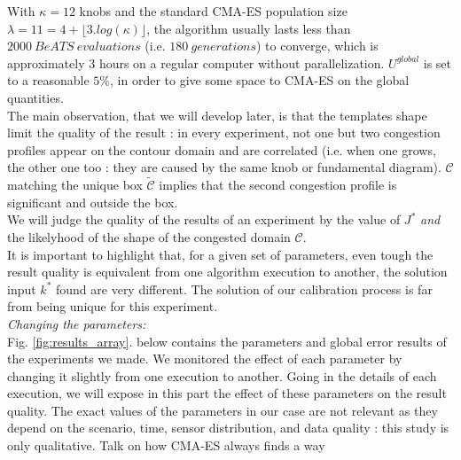 
With $\kappa=12$ knobs and the standard CMA-ES population size $\lambda=11=4+\lfloor3.log(\kappa)\rfloor$, the algorithm usually lasts less than $2000\ BeATS\ evaluations$ (i.e. $180\ generations$) to converge, which is  approximately 3 hours on a regular computer without parallelization.
$U^{global}$ is set to a reasonable $5\%$, in order to give some space to CMA-ES on the global quantities.\\
The main observation, that we will develop later, is that the templates shape limit the quality of the result : in every experiment, not one but two congestion profiles appear on the contour domain and are correlated (i.e. when one grows, the other one too : they are caused by the same knob or fundamental diagram).  $\mathscr{C}$ matching the unique box $\widetilde{\mathscr{C}}$ implies that the second congestion profile is significant and outside the box.\\
We will judge the quality of the results of an experiment by the value of $J^{*}$ \emph{and} the likelyhood of the shape of the congested domain $\mathscr{C}$. \\
It is important to highlight that, for a given set of parameters, even tough the result quality is equivalent from one algorithm execution to another, the solution input $k^{*}$ found are very different. The solution of our calibration process is far from being unique for this experiment.\\
\emph{Changing the parameters:}\\
Fig. \ref{fig:results_array}. below contains the parameters and global error results of the experiments we made. We monitored the effect of each parameter by changing it slightly from one execution to another. Going in the details of each execution, we will expose in this part the effect of these parameters on the result quality. The exact values of the parameters in our case are not relevant as they depend on the scenario, time, sensor distribution, and data quality : this study is only qualitative.
\color{red}Talk on how CMA-ES always finds a way\color{black}
